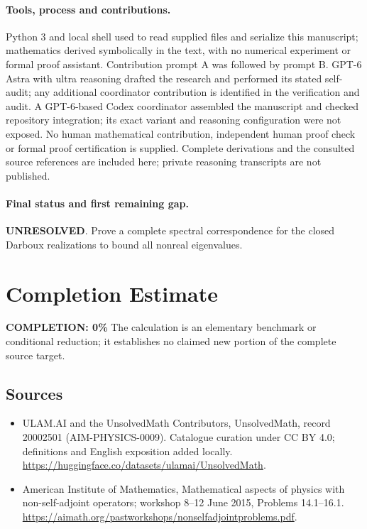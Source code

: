 \documentclass[11pt]{article}
\begin{document}
\paragraph{Tools, process and contributions.}
Python 3 and local shell used to read supplied files and serialize this manuscript; mathematics derived symbolically in the text, with no numerical experiment or formal proof assistant. Contribution prompt A was followed by prompt B. GPT-6 Astra with ultra reasoning drafted the research and performed its stated self-audit; any additional coordinator contribution is identified in the verification and audit. A GPT-6-based Codex coordinator assembled the manuscript and checked repository integration; its exact variant and reasoning configuration were not exposed. No human mathematical contribution, independent human proof check or formal proof certification is supplied. Complete derivations and the consulted source references are included here; private reasoning transcripts are not published.

\paragraph{Final status and first remaining gap.}
\textbf{UNRESOLVED}. Prove a complete spectral correspondence for the closed Darboux realizations to bound all nonreal eigenvalues.

\section{Completion Estimate}
\noindent\textbf{COMPLETION: 0\%}
The calculation is an elementary benchmark or conditional reduction; it establishes no claimed new portion of the complete source target.

\subsection{Sources}
\begin{itemize}
\item[\hypertarget{source:20002501:1}{S1}] ULAM.AI and the UnsolvedMath Contributors, UnsolvedMath, record 20002501 (AIM-PHYSICS-0009). Catalogue curation under CC BY 4.0; definitions and English exposition added locally.
\url{https://huggingface.co/datasets/ulamai/UnsolvedMath}.
\item[\hypertarget{source:20002501:2}{S2}] American Institute of Mathematics, Mathematical aspects of physics with non-self-adjoint operators; workshop 8–12 June 2015, Problems 14.1–16.1.
\url{https://aimath.org/pastworkshops/nonselfadjointproblems.pdf}.
\end{itemize}
\label{end:20002501}
\end{document}
